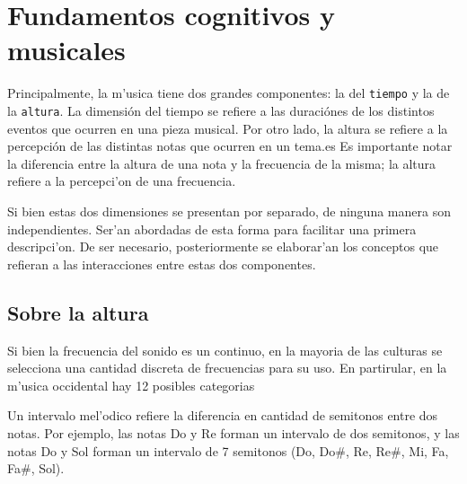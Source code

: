 \section{Fundamentos cognitivos y musicales}
\label{sec_cogn_bg}
Principalmente, la m'usica tiene dos grandes componentes: la del \texttt{tiempo} y la de la 
\texttt{altura}. La dimensi\'on del tiempo se refiere a las duraci\'ones de los distintos eventos que 
ocurren en una pieza musical. Por otro lado, la altura se refiere a la percepci\'on de las distintas notas que ocurren 
en un tema.es Es importante notar la diferencia entre la altura de una nota y la frecuencia de la misma; la altura refiere
a la percepci'on de una frecuencia.

Si bien estas dos dimensiones se presentan por separado, de ninguna manera son independientes. Ser'an abordadas de esta forma 
para facilitar una primera descripci'on. De ser necesario, posteriormente se elaborar'an los conceptos que refieran a las interacciones entre 
estas dos componentes. 

%


\subsection{Sobre la altura}

Si bien la frecuencia del sonido es un continuo, en la mayoria de las culturas se selecciona una cantidad discreta de frecuencias para su uso. 
En partirular, en la m'usica occidental hay 12 posibles categorias

Un intervalo mel'odico refiere la diferencia en cantidad de semitonos entre dos notas. Por ejemplo, las notas Do y Re forman un intervalo de dos semitonos, y las notas 
Do y Sol forman un intervalo de 7 semitonos (Do, Do\#, Re, Re\#, Mi, Fa, Fa\#, Sol). 

